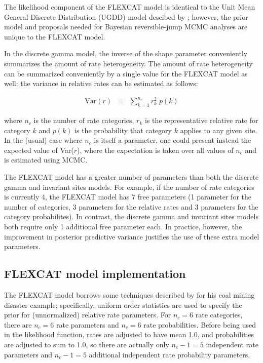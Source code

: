 \documentclass[12pt]{article}
\newcommand{\ncat}{n_c}
\begin{document}
The likelihood component of the FLEXCAT model is identical to the Unit Mean General Discrete Distribution (UGDD) model descibed by \citet{KosakovskypondMuse2005}; however, the prior model and proposals needed for Bayesian reversible-jump MCMC analyses are unique to the FLEXCAT model.

In the discrete gamma model, the inverse of the shape parameter conveniently summarizes the amount of rate heterogeneity. The amount of rate heterogeneity can be summarized conveniently by a single value for the FLEXCAT model as well: the variance in relative rates can be estimated as follows:

\begin{eqnarray*}
\mbox{Var}(r) & = & \sum_{k=1}^{\ncat} r_k^2 \; p(k)
\end{eqnarray*}

\noindent where $\ncat$ is the number of rate categories, $r_k$ is the representative relative rate for category $k$ and $p(k)$ is the probability that category $k$ applies to any given site. In the (usual) case where $\ncat$ is itself a parameter, one could present instead the expected value of Var($r$), where the expectation is taken over all values of $\ncat$ and is estimated using MCMC.

The FLEXCAT model has a greater number of parameters than both the discrete gamma and invariant sites models. For example, if the number of rate categories is currently 4, the FLEXCAT model has 7 free parameters (1 parameter for the number of categories, 3 parameters for the relative rates and 3 parameters for the category probabilites). In contrast, the discrete gamma and invariant sites models both require only 1 additional free parameter each. In practice, however, the improvement in posterior predictive variance justifies the use of these extra model parameters.

\subsection{FLEXCAT model implementation}

The FLEXCAT model borrows some techniques described by \citet{Green1995} for his coal mining disaster example; specifically, uniform order statistics are used to specify the prior for (unnormalized) relative rate parameters. For $\ncat = 6$ rate categories, there are $\ncat = 6$ rate parameters and $\ncat = 6$ rate probabilities. Before being used in the likelihood function, rates are adjusted to have mean 1.0, and probabilities are adjusted to sum to 1.0, so there are actually only $\ncat - 1 = 5$ independent rate parameters and $\ncat - 1 = 5$ additional independent rate probability parameters.
\end{document}
